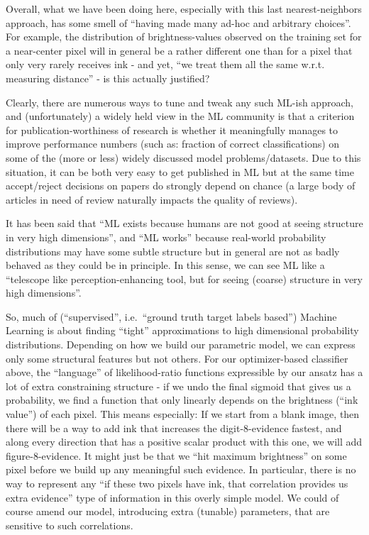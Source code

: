 \documentclass[11pt]{article}
\begin{document}
    Overall, what we have been doing here, especially with this last
nearest-neighbors approach, has some smell of ``having made many ad-hoc
and arbitrary choices''. For example, the distribution of
brightness-values observed on the training set for a near-center pixel
will in general be a rather different one than for a pixel that only
very rarely receives ink - and yet, ``we treat them all the same w.r.t.
measuring distance'' - is this actually justified?

Clearly, there are numerous ways to tune and tweak any such ML-ish
approach, and (unfortunately) a widely held view in the ML community is
that a criterion for publication-worthiness of research is whether it
meaningfully manages to improve performance numbers (such as: fraction
of correct classifications) on some of the (more or less) widely
discussed model problems/datasets. Due to this situation, it can be both
very easy to get published in ML but at the same time accept/reject
decisions on papers do strongly depend on chance (a large body of
articles in need of review naturally impacts the quality of reviews).

It has been said that ``ML exists because humans are not good at seeing
structure in very high dimensions'', and ``ML works'' because real-world
probability distributions may have some subtle structure but in general
are not as badly behaved as they could be in principle. In this sense,
we can see ML like a ``telescope like perception-enhancing tool, but for
seeing (coarse) structure in very high dimensions''.

So, much of (``supervised'', i.e.~``ground truth target labels based'')
Machine Learning is about finding ``tight'' approximations to high
dimensional probability distributions. Depending on how we build our
parametric model, we can express only some structural features but not
others. For our optimizer-based classifier above, the ``language'' of
likelihood-ratio functions expressible by our ansatz has a lot of extra
constraining structure - if we undo the final sigmoid that gives us a
probability, we find a function that only linearly depends on the
brightness (``ink value'') of each pixel. This means especially: If we
start from a blank image, then there will be a way to add ink that
increases the digit-8-evidence fastest, and along every direction that
has a positive scalar product with this one, we will add
figure-8-evidence. It might just be that we ``hit maximum brightness''
on some pixel before we build up any meaningful such evidence. In
particular, there is no way to represent any ``if these two pixels have
ink, that correlation provides us extra evidence'' type of information
in this overly simple model. We could of course amend our model,
introducing extra (tunable) parameters, that are sensitive to such
correlations.
\end{document}
